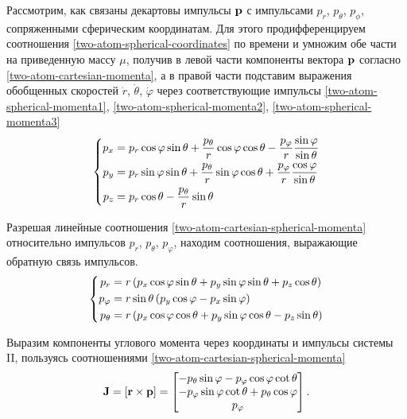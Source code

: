 Рассмотрим, как связаны декартовы импульсы $\mathbf{p}$ с импульсами $p_r$, $p_\theta$, $p_\phi$, сопряженными сферическим координатам. Для этого продифференцируем соотношения \eqref{two-atom-spherical-coordinates} по времени и умножим обе части на приведенную массу $\mu$, получив в левой части компоненты вектора $\mathbf{p}$ согласно \eqref{two-atom-cartesian-momenta}, а в правой части подставим выражения обобщенных скоростей $\dot{r}$, $\dot{\theta}$, $\dot{\varphi}$ через соответствующие импульсы \eqref{two-atom-spherical-momenta1}, \eqref{two-atom-spherical-momenta2}, \eqref{two-atom-spherical-momenta3}
\begin{gather}
    \left\{ 
    \begin{aligned}
        p_x &= p_r \cos \varphi \sin \theta + \frac{p_\theta}{r} \cos \varphi \cos \theta - \frac{p_\varphi}{r} \frac{\sin \varphi}{\sin \theta} \\ 
        p_y &= p_r \sin \varphi \sin \theta + \frac{p_\theta}{r} \sin \varphi \cos \theta + \frac{p_\varphi}{r} \frac{\cos \varphi}{\sin \theta} \\ 
        p_z &= p_r \cos \theta - \frac{p_\theta}{r} \sin \theta 
    \end{aligned}
    \right. \label{two-atom-cartesian-spherical-momenta}
\end{gather}

Разрешая линейные соотношения \eqref{two-atom-cartesian-spherical-momenta} относительно импульсов $p_r$, $p_\theta$, $p_\varphi$, находим соотношения, выражающие обратную связь импульсов.
\begin{gather}
    \left\{
    \begin{aligned}
        p_r &= r \left( p_x \cos \varphi \sin \theta + p_y \sin \varphi \sin \theta + p_z \cos \theta \right)\\
        p_\varphi &= r \sin \theta \left( p_y \cos \varphi - p_x \sin \varphi \right) \\
        p_\theta &= r \left( p_x \cos \varphi \cos \theta + p_y \sin \varphi \cos \theta - p_z \sin \theta \right)  
    \end{aligned}
    \right.
\end{gather}

Выразим компоненты углового момента через координаты и импульсы системы II, пользуясь соотношениями \eqref{two-atom-cartesian-spherical-momenta}
\begin{gather}
    \mathbf{J} = \left[ \mathbf{r} \times \mathbf{p} \right] = 
    \begin{bmatrix}
        -p_\theta \sin \varphi - p_\varphi \cos \varphi \cot \theta \\
        -p_\varphi \sin \varphi \cot \theta + p_\theta \cos \varphi \\
        p_\varphi
    \end{bmatrix}. \label{two-atom-angular-momenta-spherical} 
\end{gather}

